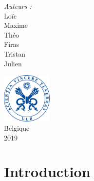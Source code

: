 \documentclass[a4paper,11pt]{article}
\begin{document}
\begin{titlepage}
\begin{center}
		\begin{minipage}[t]{0.6\textwidth}
			\begin{center} \large
				\emph{Auteurs :}            \\
				\vspace{2mm}
                Loïc           \\
                Maxime          \\
                Théo           \\
                Firas           \\
                Tristan      \\
                Julien 
			\end{center}
		\end{minipage}
			
		\vfill
			
		\includegraphics[height = 25mm]{sceau.jpg} \\
		\vspace{5mm}
		{\large Belgique \\2019}
	\end{center}
\end{titlepage}
\cleardoublepage

\tableofcontents



\cleardoublepage
{}

\section{Introduction}
\end{document}
